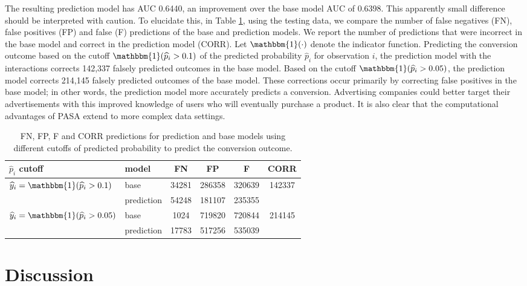 \documentclass[12pt]{article}
\begin{document}
The resulting prediction model has AUC 0.6440, an improvement over the base model AUC of 0.6398. This apparently small difference should be interpreted with caution. To elucidate this, in Table \ref{table-corrected}, using the testing data, we compare the number of false negatives (FN), false positives (FP) and false (F) predictions of the base and prediction models. We report the number of predictions that were incorrect in the base model and correct in the prediction model (CORR). Let $\mathbbm{1}(\cdot)$ denote the indicator function. Predicting the conversion outcome based on the cutoff $\mathbbm{1}(\widehat{p}_i>0.1)$ of the predicted probability $\widehat{p}_i$ for observation $i$, the prediction model with the interactions corrects 142,337 falsely predicted outcomes in the base model. Based on the cutoff $\mathbbm{1}(\widehat{p}_i>0.05)$, the prediction model corrects 214,145 falsely predicted outcomes of the base model. These corrections occur primarily by correcting false positives in the base model; in other words, the prediction model more accurately predicts a conversion. Advertising companies could better target their advertisements with this improved knowledge of users who will eventually purchase a product. It is also clear that the computational advantages of PASA extend to more complex data settings.
\begin{table}[ht]
\centering
\begin{tabular}{ll | cccc}
$\widehat{p}_i$ cutoff & model & FN & FP & F & CORR \\ 
\hline
\multirow{2}{*}{$\widehat{y}_i=\mathbbm{1}(\widehat{p}_i>0.1)$} & base & 34281 & 286358 & 320639 & \multirow{2}{*}{142337} \\ 
 & prediction & 54248 & 181107 & 235355 & \\ 
 \multirow{2}{*}{$\widehat{y}_i=\mathbbm{1}(\widehat{p}_i>0.05)$} & base & 1024 & 719820 & 720844 & \multirow{2}{*}{214145} \\ 
 & prediction & 17783 & 517256 & 535039 & \\ 
\end{tabular}
\caption{FN, FP, F and CORR predictions for prediction and base models using different cutoffs of predicted probability to predict the conversion outcome. \label{table-corrected}}
\end{table}

\section{Discussion}
\label{sec:discussion}
\end{document}
